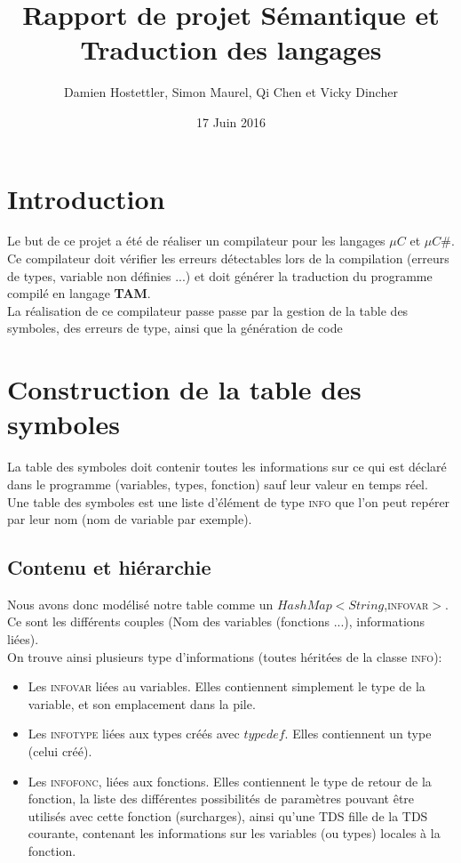 \documentclass[11pt,a4paper]{report}
\author{Damien Hostettler, Simon Maurel, Qi Chen et Vicky Dincher}
\title{Rapport de projet Sémantique et Traduction des langages}
\date{17 Juin 2016}
\begin{document}
\maketitle
\tableofcontents
\newpage
 
\section*{Introduction}

Le but de ce projet a été de réaliser un compilateur pour les langages $\mu C$ et $\mu C \#$. Ce compilateur doit vérifier les erreurs détectables lors de la compilation (erreurs de types, variable non définies ...) et doit générer la traduction du programme compilé en langage \textbf{TAM}.\\
La réalisation de ce compilateur passe passe par la gestion de la table des symboles, des erreurs de type, ainsi que la génération de code


\section{Construction de la table des symboles}

La table des symboles doit contenir toutes les informations sur ce qui est déclaré dans le programme (variables, types, fonction) sauf leur valeur en temps réel. \\
Une table des symboles est une liste d'élément de type \textsc{info} que l'on peut repérer par leur nom (nom de variable par exemple).

\subsection{Contenu et hiérarchie}

Nous avons donc modélisé notre table comme un $HashMap<String$,\textsc{infovar}$>$.
Ce sont les différents couples (Nom des variables (fonctions ...), informations liées).\\
On trouve ainsi plusieurs type d'informations (toutes héritées de la classe \textsc{info}): 
\begin{itemize}
\item Les \textsc{infovar} liées au variables. Elles contiennent simplement le type de la variable, et son emplacement dans la pile. 
\item Les \textsc{infotype} liées aux types créés avec $typedef$. Elles contiennent un type (celui créé). 
\item Les \textsc{infofonc}, liées aux fonctions. Elles contiennent le type de retour de la fonction, la liste des différentes possibilités de paramètres pouvant être utilisés avec cette fonction (surcharges), ainsi qu'une TDS fille de la TDS courante, contenant les informations sur les variables (ou types) locales à la fonction. 
\end{itemize}
\end{document}
